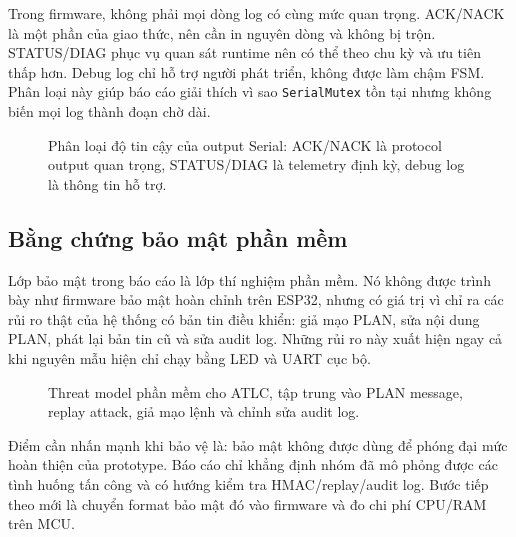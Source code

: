 Trong firmware, không phải mọi dòng log có cùng mức quan trọng. ACK/NACK là một phần của giao thức, nên cần in nguyên dòng và không bị trộn. STATUS/DIAG phục vụ quan sát runtime nên có thể theo chu kỳ và ưu tiên thấp hơn. Debug log chỉ hỗ trợ người phát triển, không được làm chậm FSM. Phân loại này giúp báo cáo giải thích vì sao \texttt{SerialMutex} tồn tại nhưng không biến mọi log thành đoạn chờ dài.

\begin{figure}[H]
  \centering
  \caption{Phân loại độ tin cậy của output Serial: ACK/NACK là protocol output quan trọng, STATUS/DIAG là telemetry định kỳ, debug log là thông tin hỗ trợ.}
  \label{fig:appendix-logging-reliability}
\end{figure}

\subsection{Bằng chứng bảo mật phần mềm}

Lớp bảo mật trong báo cáo là lớp thí nghiệm phần mềm. Nó không được trình bày như firmware bảo mật hoàn chỉnh trên ESP32, nhưng có giá trị vì chỉ ra các rủi ro thật của hệ thống có bản tin điều khiển: giả mạo PLAN, sửa nội dung PLAN, phát lại bản tin cũ và sửa audit log. Những rủi ro này xuất hiện ngay cả khi nguyên mẫu hiện chỉ chạy bằng LED và UART cục bộ.

\begin{figure}[H]
  \centering
  \caption{Threat model phần mềm cho ATLC, tập trung vào PLAN message, replay attack, giả mạo lệnh và chỉnh sửa audit log.}
  \label{fig:appendix-security-threat-model}
\end{figure}

Điểm cần nhấn mạnh khi bảo vệ là: bảo mật không được dùng để phóng đại mức hoàn thiện của prototype. Báo cáo chỉ khẳng định nhóm đã mô phỏng được các tình huống tấn công và có hướng kiểm tra HMAC/replay/audit log. Bước tiếp theo mới là chuyển format bảo mật đó vào firmware và đo chi phí CPU/RAM trên MCU.
